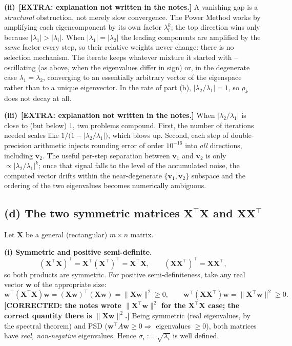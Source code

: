 \documentclass[12pt,a4paper]{article}
\newcommand{\fix}[1]{{\textbf{\textcolor{orange!85!black}{[CORRECTED: #1]}}}}
\newcommand{\extra}[1]{{\textbf{\textcolor{blue!80!black}{[EXTRA: #1]}}}}
\theoremstyle{definition}
\newcommand{\Xb}{\mathbf{X}}
\newcommand{\vv}{\mathbf{v}}
\newcommand{\norm}[1]{\lVert #1 \rVert}
\newcommand{\T}{^{\!\top}}
\begin{document}
\textbf{(ii)}~\extra{explanation not written in the notes.} A vanishing gap is
a \emph{structural} obstruction, not merely slow convergence. The Power Method
works by amplifying each eigencomponent by its own factor $\lambda_i^{k}$; the
top direction wins only because $|\lambda_1|>|\lambda_i|$. When
$|\lambda_1|=|\lambda_2|$ the leading components are amplified by the
\emph{same} factor every step, so their relative weights never change: there is
no selection mechanism. The iterate keeps whatever mixture it started with --
oscillating (as above, when the eigenvalues differ in sign) or, in the
degenerate case $\lambda_1=\lambda_2$, converging to an essentially arbitrary
vector of the eigenspace rather than to a unique eigenvector. In the rate of
part (b), $|\lambda_2/\lambda_1|=1$, so $\rho_k$ does not decay at all.

\textbf{(iii)}~\extra{explanation not written in the notes.} When
$|\lambda_2/\lambda_1|$ is close to (but below) $1$, two problems compound.
First, the number of iterations needed scales like
$1/\bigl(1-|\lambda_2/\lambda_1|\bigr)$, which blows up. Second, each step of
double-precision arithmetic injects rounding error of order $10^{-16}$ into
\emph{all} directions, including $\vv_2$. The useful per-step separation
between $\vv_1$ and $\vv_2$ is only $\propto |\lambda_2/\lambda_1|^{k}$; once that
signal falls to the level of the accumulated noise, the computed vector drifts
within the near-degenerate $\{\vv_1,\vv_2\}$ subspace and the ordering of the
two eigenvalues becomes numerically ambiguous.

\subsection{(d) The two symmetric matrices $\Xb\T\Xb$ and $\Xb\Xb\T$}

Let $\Xb$ be a general (rectangular) $m\times n$ matrix.

\textbf{(i) Symmetric and positive semi-definite.}
\[
(\Xb\T\Xb)\T=\Xb\T(\Xb\T)\T=\Xb\T\Xb,\qquad
(\Xb\Xb\T)\T=\Xb\Xb\T,
\]
so both products are symmetric. For positive semi-definiteness, take any real
vector $\mathbf w$ of the appropriate size:
\[
\mathbf w\T(\Xb\T\Xb)\mathbf w=(\Xb\mathbf w)\T(\Xb\mathbf w)=\norm{\Xb\mathbf w}^2\ge0,
\qquad
\mathbf w\T(\Xb\Xb\T)\mathbf w=\norm{\Xb\T\mathbf w}^2\ge0 .
\]
\fix{the notes wrote $\norm{\Xb\T\mathbf w}^2$ for the $\Xb\T\Xb$ case; the correct
quantity there is $\norm{\Xb\mathbf w}^2$.} Being symmetric (real eigenvalues, by
the spectral theorem) and PSD ($\mathbf w\T A\mathbf w\ge0\Rightarrow$ eigenvalues
$\ge0$), both matrices have \emph{real, non-negative} eigenvalues. Hence
$\sigma_i:=\sqrt{\lambda_i}$ is well defined.
\end{document}
